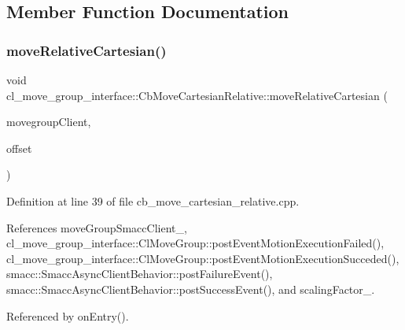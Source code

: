 \subsection{Member Function Documentation}
\mbox{\label{classcl__move__group__interface_1_1CbMoveCartesianRelative_ae8443c7f81affe5c4450e83fc665487f}} 
\subsubsection{\texorpdfstring{move\+Relative\+Cartesian()}{moveRelativeCartesian()}}
{\footnotesize\ttfamily void cl\+\_\+move\+\_\+group\+\_\+interface\+::\+Cb\+Move\+Cartesian\+Relative\+::move\+Relative\+Cartesian (\begin{DoxyParamCaption}\item[{moveit\+::planning\+\_\+interface\+::\+Move\+Group\+Interface $\ast$}]{movegroup\+Client,  }\item[{geometry\+\_\+msgs\+::\+Vector3 \&}]{offset }\end{DoxyParamCaption})}



Definition at line 39 of file cb\+\_\+move\+\_\+cartesian\+\_\+relative.\+cpp.



References move\+Group\+Smacc\+Client\+\_\+, cl\+\_\+move\+\_\+group\+\_\+interface\+::\+Cl\+Move\+Group\+::post\+Event\+Motion\+Execution\+Failed(), cl\+\_\+move\+\_\+group\+\_\+interface\+::\+Cl\+Move\+Group\+::post\+Event\+Motion\+Execution\+Succeded(), smacc\+::\+Smacc\+Async\+Client\+Behavior\+::post\+Failure\+Event(), smacc\+::\+Smacc\+Async\+Client\+Behavior\+::post\+Success\+Event(), and scaling\+Factor\+\_\+.



Referenced by on\+Entry().


